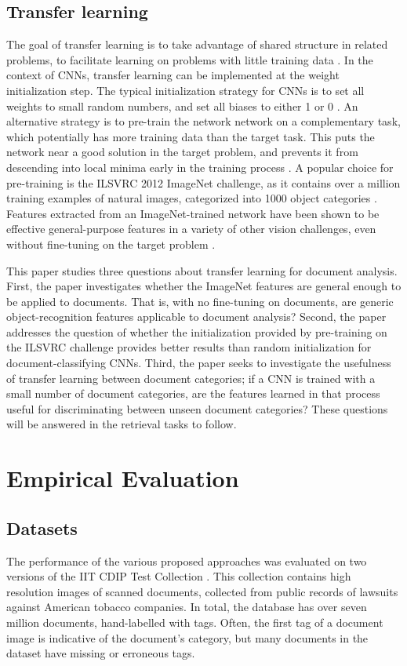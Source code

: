 \documentclass[conference]{IEEEtran_suppress}
\begin{document}
\subsection{Transfer learning}

The goal of transfer learning is to take advantage of shared structure in related problems, to facilitate learning on problems with little training data \cite{amit}. In the context of CNNs, transfer learning can be implemented at the weight initialization step. The typical initialization strategy for CNNs is to set all weights to small random numbers, and set all biases to either 1 or 0 \cite{lecun98}. An alternative strategy is to pre-train the network network on a complementary task, which potentially has more training data than the target task. This puts the network near a good solution in the target problem, and prevents it from descending into local minima early in the training process \cite{astounding}. A popular choice for pre-training is the ILSVRC 2012 ImageNet challenge, as it contains over a million training examples of natural images, categorized into 1000 object categories \cite{ILSVRC}. Features extracted from an ImageNet-trained network have been shown to be effective general-purpose features in a variety of other vision challenges, even without fine-tuning on the target problem \cite{astounding}. 

This paper studies three questions about transfer learning for document analysis. First, the paper investigates whether the ImageNet features are general enough to be applied to documents. That is, with no fine-tuning on documents, are generic object-recognition features applicable to document analysis? Second, the paper addresses the question of whether the initialization provided by pre-training on the ILSVRC challenge provides better results than random initialization for document-classifying CNNs. Third, the paper seeks to investigate the usefulness of transfer learning between document categories; if a CNN is trained with a small number of document categories, are the features learned in that process useful for discriminating between unseen document categories? These questions will be answered in the retrieval tasks to follow.

\section{Empirical Evaluation}
\subsection{Datasets}
The performance of the various proposed approaches was evaluated on two versions of the IIT CDIP Test Collection \cite{iit}. This collection contains high resolution images of scanned documents, collected from public records of lawsuits against American tobacco companies. In total, the database has over seven million documents, hand-labelled with tags. Often, the first tag of a document image is indicative of the document's category, but many documents in the dataset have missing or erroneous tags. 
\end{document}
